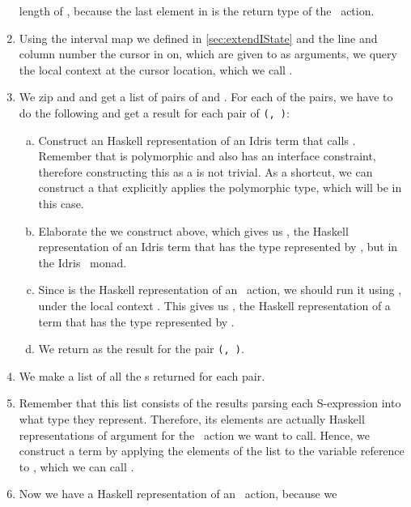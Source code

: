 \begin{enumerate}
    length of , because the last element in  is the
    return type of the \Elab\ action.
  \item Using the interval map we defined in \autoref{sec:extendIState} and the
    line and column number the cursor in on, which are given to 
    as arguments, we query the local context at the cursor location, which we
    call .
  \item We zip  and  and get a list of pairs of
     and .
    For each of the pairs, we have to do the following and get a result for
    each pair of \texttt{(, )}:
    \begin{enumerate}[(a)]
      \item \label{item:fromEditor} Construct an Haskell representation of an
        Idris term that calls . Remember that  is
        polymorphic and also has an interface constraint, therefore
        constructing this as a  is not trivial.  As a shortcut, we can
        construct a  that explicitly applies the polymorphic type,
        which will be  in this case.
      \item Elaborate the  we construct above, which gives us
        , the Haskell representation of an Idris term that has the type
        represented by , but in the Idris \Elab\ monad.
      \item Since  is the Haskell representation of an \Elab\ action, we
        should run it using , under the local context
        . This gives us , the Haskell representation of a term
        that has the type represented by .
      \item We return  as the result for the pair
        \texttt{(, )}.
    \end{enumerate}
  \item We make a list of all the s returned for each pair.
  \item Remember that this list consists of the results parsing each
    S-expression into what type they represent. Therefore, its elements are
    actually Haskell representations of argument for the \Elab\ action we want
    to call. Hence, we construct a term by applying the elements of the list to
    the variable reference to , which we can call .
  \item \label{item:extract}
    Now we have a Haskell representation of an \Elab\ action, because we

\end{enumerate}
